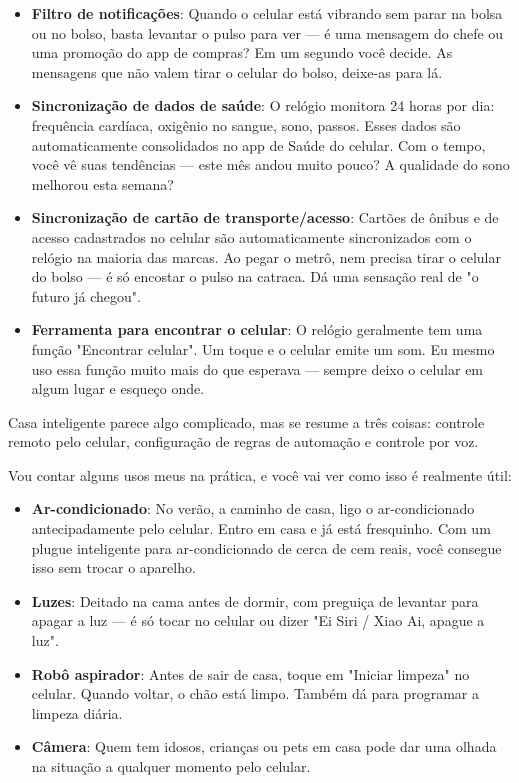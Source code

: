 \begin{itemize}
  \item \textbf{Filtro de notificações}: Quando o celular está vibrando sem parar na bolsa ou no bolso, basta levantar o pulso para ver — é uma mensagem do chefe ou uma promoção do app de compras? Em um segundo você decide. As mensagens que não valem tirar o celular do bolso, deixe-as para lá.
  \item \textbf{Sincronização de dados de saúde}: O relógio monitora 24 horas por dia: frequência cardíaca, oxigênio no sangue, sono, passos. Esses dados são automaticamente consolidados no app de Saúde do celular. Com o tempo, você vê suas tendências — este mês andou muito pouco? A qualidade do sono melhorou esta semana?
  \item \textbf{Sincronização de cartão de transporte/acesso}: Cartões de ônibus e de acesso cadastrados no celular são automaticamente sincronizados com o relógio na maioria das marcas. Ao pegar o metrô, nem precisa tirar o celular do bolso — é só encostar o pulso na catraca. Dá uma sensação real de "o futuro já chegou".
  \item \textbf{Ferramenta para encontrar o celular}: O relógio geralmente tem uma função "Encontrar celular". Um toque e o celular emite um som. Eu mesmo uso essa função muito mais do que esperava — sempre deixo o celular em algum lugar e esqueço onde.
\end{itemize}


Casa inteligente parece algo complicado, mas se resume a três coisas: controle remoto pelo celular, configuração de regras de automação e controle por voz.

Vou contar alguns usos meus na prática, e você vai ver como isso é realmente útil:

\begin{itemize}
  \item \textbf{Ar-condicionado}: No verão, a caminho de casa, ligo o ar-condicionado antecipadamente pelo celular. Entro em casa e já está fresquinho. Com um plugue inteligente para ar-condicionado de cerca de cem reais, você consegue isso sem trocar o aparelho.
  \item \textbf{Luzes}: Deitado na cama antes de dormir, com preguiça de levantar para apagar a luz — é só tocar no celular ou dizer "Ei Siri / Xiao Ai, apague a luz".
  \item \textbf{Robô aspirador}: Antes de sair de casa, toque em "Iniciar limpeza" no celular. Quando voltar, o chão está limpo. Também dá para programar a limpeza diária.
  \item \textbf{Câmera}: Quem tem idosos, crianças ou pets em casa pode dar uma olhada na situação a qualquer momento pelo celular.
\end{itemize}

